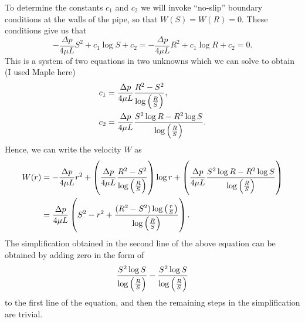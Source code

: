 \documentclass{article}
\begin{document}
To determine the constants $c_1$ and $c_2$ we will invoke ``no-slip''
boundary conditions at the walls of the pipe, so that $W(S) = W(R) =
0$. These conditions give us that
%
\begin{equation*}
    - \frac{\Delta p}{4 \mu L} S^2 + c_1 \log S + c_2
    = - \frac{\Delta p}{4 \mu L} R^2 + c_1 \log R + c_2
    = 0
    .
\end{equation*}
%
This is a system of two equations in two unknowns which we can solve to
obtain (I used Maple here)
%
\begin{align*}
    c_1 &= \frac{\Delta p}{4 \mu L} \frac{R^2 - S^2}{\log\del{\frac{R}{S}}}, \\
    c_2 &= \frac{\Delta p}{4 \mu L} \frac{S^2 \log R - R^2 \log S}{\log\del{\frac{R}{S}}}
    .
\end{align*}
%
Hence, we can write the velocity $W$ as
%
\begin{align*}
    W(r) &= - \frac{\Delta p}{4 \mu L} r^2
        + \del{\frac{\Delta p}{4 \mu L} \frac{R^2 - S^2}{\log\del{\frac{R}{S}}}} \log r
        + \del{\frac{\Delta p}{4 \mu L} \frac{S^2 \log R - R^2 \log S}{\log\del{\frac{R}{S}}}} \\
         &= \frac{\Delta p}{4 \mu L} \del{S^2 - r^2 + \frac{(R^2 - S^2) \log\del{\frac{r}{S}}}{\log\del{\frac{R}{S}}}}
    .
\end{align*}
%
The simplification obtained in the second line of the above equation can
be obtained by adding zero in the form of
%
\begin{equation*}
    \frac{S^2 \log{S}}{\log\del{\frac{R}{S}}}
    - \frac{S^2 \log{S}}{\log\del{\frac{R}{S}}}
\end{equation*}
%
to the first line of the equation, and then the remaining steps in the
simplification are trivial.
\end{document}

